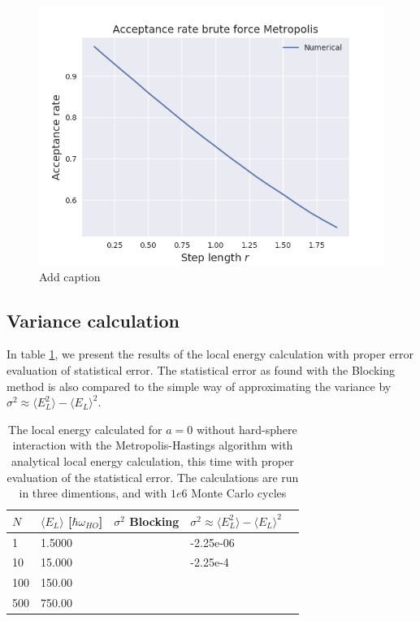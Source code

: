 \documentclass[norsk,a4paper,12pt]{article}
\begin{document}
\begin{figure} [H]
    \centering
    \includegraphics[scale=0.65]{images/acceptance_BF.png}
    \caption{Add caption}
    \label{fig:acceptance_BF}
\end{figure} 

\subsection{Variance calculation}

In table \ref{tab:variance_analysis}, we present the results of the local energy calculation with proper error evaluation of statistical error. The statistical error as found with the Blocking method is also compared to the simple way of approximating the variance by $\sigma^2 \approx \langle E_L^2 \rangle - \langle E_L \rangle^2$. 

\begin{table} [H]
	\centering
	\caption{The local energy calculated for $a=0$  without hard-sphere interaction with the Metropolis-Hastings algorithm with analytical local energy calculation, this time with proper evaluation of the statistical error. The calculations are run in three dimentions, and with $1e6$ Monte Carlo cycles}
	\begin{tabularx}{\textwidth}{X|XXXX} \hline
		\label{tab:variance_analysis}
		$N$ & $\langle E_L\rangle$ [$\hbar\omega_{HO}$] & $\sigma^2$ Blocking & $\sigma^2 \approx \langle E_L^2 \rangle - \langle E_L \rangle^2$ \\ \hline
		1 & 1.5000 &  & -2.25e-06\\
		10 & 15.000 &  & -2.25e-4\\
		100 & 150.00 &  &\\
		500 & 750.00 &  &\\ \hline
	\end{tabularx}
\end{table}
\end{document}
